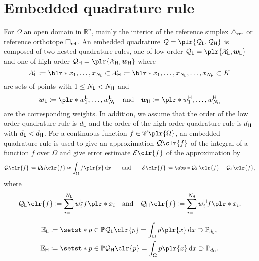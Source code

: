 
\section{Embedded quadrature rule}

For \( \Omega \) an open domain in \( \mathbb{R}^n \), mainly the interior of the reference simplex \( \triangle_{\mathsf{ref}} \) or reference orthotope \( \square_{\mathsf{ref}} \).
An embedded quadrature \( \Quad = \plr{\Quad_\lo, \Quad_\hi} \) is composed of two nested quadrature rules, one of low order \( \Quad_\lo = \plr{\calX_\lo, \vec{w}_\lo} \) and one of high order \( \Quad_\hi = \plr{\calX_\hi, \vec{w}_\hi} \) where
\[
    \calX_\lo \coloneqq \blr*{x_1, \ldots, x_{N_\lo}}
    \subset \calX_\hi \coloneqq \blr*{x_1, \ldots, x_{N_\lo}, \ldots, x_{N_\hi}}
    \subset K
\]
are sets of points with \( 1 \leq N_{\mathsf{L}} < N_{\mathsf{H}} \) and
\[
    \vec{w}_\lo \coloneqq \plr*{w_1^\lo, \ldots, w_{N_\lo}^\lo}
    \quad \text{and} \quad
    \vec{w}_\hi \coloneqq \plr*{w_1^\hi, \ldots, w_{N_\hi}^\hi}
\]
are the corresponding weights.
In addition, we assume that the order of the low order quadrature rule is \( d_{\mathsf{L}} \) and the order of the high order quadrature rule is \( d_{\mathsf{H}} \) with \( d_{\mathsf{L}} < d_{\mathsf{H}} \).
For a continuous function \( f \in \spC\plr{\Omega} \), an embedded quadrature rule is used to give an approximation \( \Quad\clr{f} \) of the integral of a function \( f \) over \( \Omega \) and give error estimate \( \Err\clr{f} \) of the approximation by
\[
    \Quad\clr{f} \coloneqq \Quad_\hi\clr{f} \approx \int_\Omega f\plr{x} \di{x}
    \qquad \text{and} \qquad
    \Err\clr{f} \coloneqq \abs*{\Quad_\hi\clr{f} - \Quad_\lo\clr{f}},
\]
where
\[
    \Quad_\lo\clr{f} \coloneqq \sum_{i=1}^{N_\lo} w_i^\lo f\plr*{x_i}
    \quad \text{and} \quad
    \Quad_\hi\clr{f} \coloneqq \sum_{i=1}^{N_\hi} w_i^\hi f\plr*{x_i}.
\]

\begin{align*}
    \mathbb{E}_\lo & \coloneqq \setst*{p \in \spPolyP}{\Quad_\lo\clr{p} = \int_\Omega p\plr{x} \di{x}} \supset \spPolyP[d_\lo],
    \\
    \mathbb{E}_\hi & \coloneqq \setst*{p \in \spPolyP}{\Quad_\hi\clr{p} = \int_\Omega p\plr{x} \di{x}} \supset \spPolyP[d_\hi].
\end{align*}
